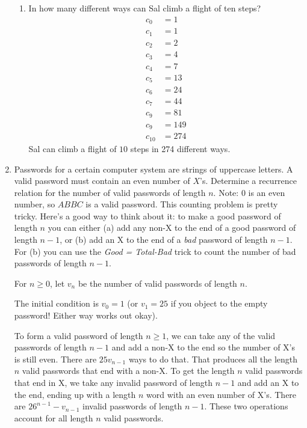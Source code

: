 \documentclass[11pt]{amsart}
\begin{document}
\begin{enumerate}
\begin{enumerate}
\item In how many different ways can Sal climb a flight of ten steps?\\[3pt]
{\color{blue}
\begin{align*}
c_0 &= 1\\
c_1 &= 1\\
c_2 &= 2\\
c_3 &= 4\\
c_4 &= 7\\
c_5 &= 13\\
c_6 &= 24\\
c_7 &= 44\\
c_9 &= 81\\
c_9 &= 149\\
c_{10} &= 274
\end{align*}
Sal can climb a flight of $10$ steps in 274 different ways.\\[5pt]
}

\end{enumerate}

\item  Passwords for a certain computer system are strings of uppercase letters.
A valid password must contain an even number of $X$'s. Determine a recurrence
relation for the number of valid passwords of length $n$.
Note: $0$ is an even number, so $ABBC$ is a valid password. This counting problem is pretty tricky. Here's a good way to think about it: to make a good password of length $n$
you can either (a) add any non-X to the end of a  good password of length $n-1$, or (b) add an X to the end of a {\it bad} password of length $n-1$. For (b) you can use the {\it Good = Total-Bad} trick to count the number of bad passwords of length $n-1$.\\[5pt]

{\color{blue}
For $n\geq 0$, let $v_n$ be the number of valid passwords of length $n$.

The initial  condition is $v_0 = 1$ (or $v_1 = 25$ if you object to the empty password! Either way works out okay).

To form a valid password of length $n\geq 1$, we can take any of the valid passwords of length $n-1$ and add a non-X to the end so the number of X's is still even.  There are $25v_{n-1}$ ways to do that. That produces all the length $n$ valid passwords that end with a non-X. To get the length $n$ valid passwords that end in X, we take any  invalid password of length $n-1$ and add an X to the end, ending up with a length $n$ word with an even number of X's. There are $26^{n-1} - v_{n-1}$ invalid passwords of length $n-1$.
These two operations account for all length $n$ valid passwords.

}
\end{enumerate}
\end{document}
